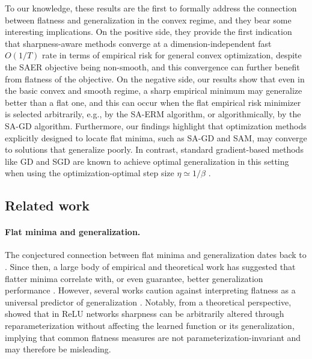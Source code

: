 \documentclass[11pt]{article}
\begin{document}
To our knowledge, these results are the first to formally address the connection between flatness and generalization in the convex regime, and they bear some interesting implications. 
On the positive side, they provide the first indication that sharpness-aware methods converge at a dimension-independent fast $O(1/T)$ rate in terms of empirical risk for general convex optimization, despite the SAER objective being non-smooth, and this convergence can further benefit from flatness of the objective. %
On the negative side, our results show that even in the basic convex and smooth regime, a sharp empirical minimum may generalize better than a flat one, and this can occur when the flat empirical risk minimizer is selected arbitrarily, e.g., by the SA-ERM algorithm, or algorithmically, by the SA-GD algorithm. Furthermore, our findings highlight that optimization methods explicitly designed to locate flat minima, such as SA-GD and SAM, may converge to solutions that generalize poorly. In contrast, standard gradient-based methods like GD and SGD are known to achieve optimal generalization in this setting when using the optimization-optimal step size $\eta \simeq 1/\beta$ \citep{lei2020fine,nikolakakis2022beyond}. 





\subsection{Related work}
\label{sec:related} 
\paragraph{Flat minima and generalization.}

The conjectured connection between flat minima and generalization dates back to \citet{hochreiter1997flat}. Since then, a large body of empirical and theoretical work has suggested that flatter minima correlate with, or even guarantee, better generalization performance \cite{keskar2016large,dziugaite2017computing,neyshabur2017exploring,wu2018sgd,Jastrzebski2017minima,jiang2019fantastic,wei2019data,wei2019improved,blanc2020implicit,haochen2021shape,foret2021sharpness,damian2021label,li2021happens,ma2021linear,nacson2022implicit,wei2022statistically,lyu2022understanding,norton2023diametrical,wu2023implicit,ding2024flat}. However, several works caution against interpreting flatness as a universal predictor of generalization \citep{dinh2017sharp,andriushchenko2023modern,wen2023sharpness,ramasinghe2023much}. Notably, from a theoretical perspective, \citet{dinh2017sharp} showed that in ReLU networks sharpness can be arbitrarily altered through reparameterization without affecting the learned function or its generalization, implying that common flatness measures are not parameterization-invariant and may therefore be misleading. 
\end{document}
